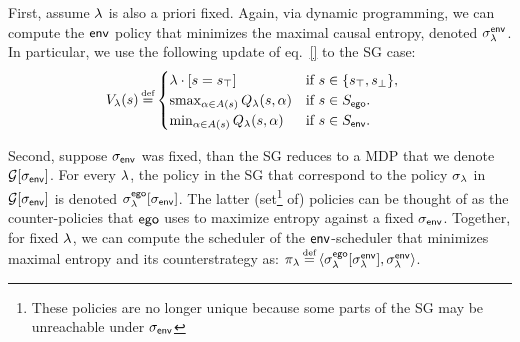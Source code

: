 First, assume $\lambda$ is also a priori fixed.  
Again, via dynamic programming, we can compute the
$\mathsf{env}$ policy that minimizes the maximal causal entropy, denoted $\sigma_\lambda^{\mathsf{env}}$.
In particular, we use the following update of eq.~\ref{} to the SG case:
 \begin{align}
   & V_\rat(s) \eqdef  \begin{cases}
     \lambda  \cdot \indicator{s = \target} & \text{if }s \in \{ \target, \sink \},\\
     \smoothmax_{\act \in \EnAct(s)}{  Q_\rat(s,\act) } & \text{if } s \in S_\pOne. \\
     \min_{\act \in \EnAct(s)}{  Q_\rat(s,\act) } &  \text{if } s \in S_\pTwo.
   \end{cases}
 \end{align}

Second, suppose ${\sigma_{\mathsf{env}}}$ was fixed, than the SG reduces to 
a MDP that we denote $\mathcal{G}[{\sigma_{\mathsf{env}}}]$.
For every $\lambda$, the policy in the SG that correspond to the policy $\sigma_\lambda$ in $\mathcal{G}[{\sigma_{\mathsf{env}}}]$ is denoted $\sigma^{\mathsf{ego}}_\lambda[{\sigma_{\mathsf{env}}}]$.
The latter (set\footnote{These policies are no longer unique because some parts of the SG may be unreachable under ${\sigma_{\mathsf{env}}}$} of) policies can be thought of as the counter-policies that $\mathsf{ego}$ uses to maximize entropy against a fixed ${\sigma_{\mathsf{env}}}$. 
Together, for fixed $\lambda$, we can compute the scheduler of the $\mathsf{env}$-scheduler that minimizes maximal entropy and its counterstrategy as: $\pi_\rat \eqdef \langle
\sched^\pOne_\rat[\sched_\rat^\pTwo] , \sched_\rat^\pTwo \rangle$.
%

